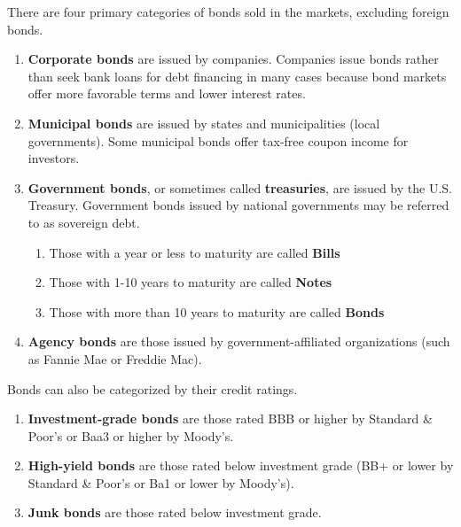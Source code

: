 \documentclass{article}
\begin{document}
    \begin{definition}
      \label{def:types-of-bonds-by-issuer}
 
      There are four primary categories of bonds sold in the markets, excluding foreign bonds. 
      \begin{enumerate}
        \item \textbf{Corporate bonds} are issued by companies. Companies issue bonds rather than seek bank loans for debt financing in many cases because bond markets offer more favorable terms and lower interest rates.
        \item \textbf{Municipal bonds} are issued by states and municipalities (local governments). Some municipal bonds offer tax-free coupon income for investors. 
        \item \textbf{Government bonds}, or sometimes called \textbf{treasuries}, are issued by the U.S. Treasury. Government bonds issued by national governments may be referred to as sovereign debt. 
        \begin{enumerate}
            \item Those with a year or less to maturity are called \textbf{Bills}
            \item Those with 1-10 years to maturity are called \textbf{Notes}
            \item Those with more than 10 years to maturity are called \textbf{Bonds}
        \end{enumerate}
        \item \textbf{Agency bonds} are those issued by government-affiliated organizations (such as Fannie Mae or Freddie Mac). 
      \end{enumerate}
    \end{definition}

    \begin{definition}
      \label{def:types-of-bonds-by-grade}
      Bonds can also be categorized by their credit ratings. 
      \begin{enumerate}
        \item \textbf{Investment-grade bonds} are those rated BBB or higher by Standard \& Poor's or Baa3 or higher by Moody's. 
        \item \textbf{High-yield bonds} are those rated below investment grade (BB+ or lower by Standard \& Poor's or Ba1 or lower by Moody's). 
        \item \textbf{Junk bonds} are those rated below investment grade. 
      \end{enumerate}
    \end{definition}
\end{document}
